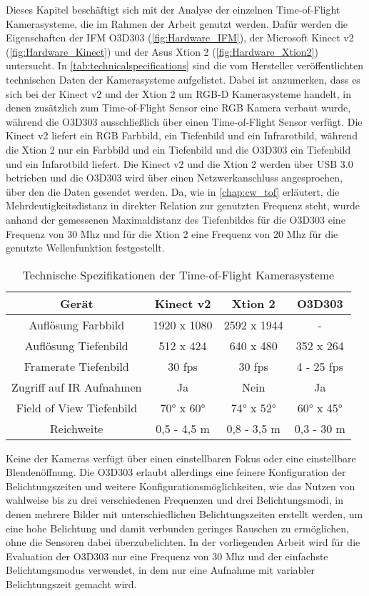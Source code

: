 \documentclass[thesis.tex]{subfiles}
\begin{document}
Dieses Kapitel beschäftigt sich mit der Analyse der einzelnen Time-of-Flight Kamerasysteme, die im Rahmen der Arbeit genutzt werden. Dafür werden die Eigenschaften der IFM O3D303 (\autoref{fig:Hardware_IFM}), der Microsoft Kinect v2 (\autoref{fig:Hardware_Kinect}) und der Asus Xtion 2 (\autoref{fig:Hardware_Xtion2}) untersucht. In \autoref{tab:technicalspecifications} sind die vom Hersteller veröffentlichten technischen Daten der Kamerasysteme aufgelistet. Dabei ist anzumerken, dass es sich bei der Kinect v2 und der Xtion 2 um RGB-D Kamerasysteme handelt, in denen zusätzlich zum Time-of-Flight Sensor eine RGB Kamera verbaut wurde, während die O3D303 ausschließlich über einen Time-of-Flight Sensor verfügt. Die Kinect v2 liefert ein RGB Farbbild, ein Tiefenbild und ein Infrarotbild, während die Xtion 2 nur ein Farbbild und ein Tiefenbild und die O3D303 ein Tiefenbild und ein Infarotbild liefert. Die Kinect v2 und die Xtion 2 werden über USB 3.0 betrieben und die O3D303 wird über einen Netzwerkanschluss angesprochen, über den die Daten gesendet werden. Da, wie in \autoref{chap:cw_tof} erläutert, die Mehrdeutigkeitsdistanz in direkter Relation zur genutzten Frequenz steht, wurde anhand der gemessenen Maximaldistanz des Tiefenbildes für die O3D303 eine Frequenz von 30 Mhz und für die Xtion 2 eine Frequenz von 20 Mhz für die genutzte Wellenfunktion festgestellt.
%
\begin{table}[h!]
\centering
\caption{Technische Spezifikationen der Time-of-Flight Kamerasysteme}
\begin{tabular}{|c|c|c|c|}
    \hline
    Gerät & Kinect v2 & Xtion 2 & O3D303 \\
    \hline
    Auflösung Farbbild      & 1920 x 1080 & 2592 x 1944 & - \\
    Auflösung Tiefenbild    & 512 x 424 & 640 x 480 & 352 x 264 \\
    Framerate Tiefenbild    & 30 fps & 30 fps & 4 - 25 fps  \\
    Zugriff auf IR Aufnahmen & Ja & Nein & Ja \\
    Field of View Tiefenbild & \ang{70} x \ang{60} & \ang{74} x \ang{52} & \ang{60} x \ang{45}\\
    Reichweite              & 0,5 - 4,5 m & 0,8 - 3,5 m & 0,3 - 30 m \\
    \hline
\end{tabular}
\label{tab:technicalspecifications}
\end{table}
%
Keine der Kameras verfügt über einen einstellbaren Fokus oder eine einstellbare Blendenöffnung. Die O3D303 erlaubt allerdings eine feinere Konfiguration der Belichtungszeiten und weitere Konfigurationsmöglichkeiten, wie das Nutzen von wahlweise bis zu drei verschiedenen Frequenzen und drei Belichtungsmodi, in denen mehrere Bilder mit unterschiedlichen Belichtungszeiten erstellt werden, um eine hohe Belichtung und damit verbunden geringes Rauschen zu ermöglichen, ohne die Sensoren dabei überzubelichten. In der vorliegenden Arbeit wird für die Evaluation der O3D303 nur eine Frequenz von 30 Mhz und der einfachste Belichtungsmodus verwendet, in dem nur eine Aufnahme mit variabler Belichtungszeit gemacht wird.
\end{document}
